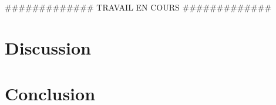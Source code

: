 \#\#\#\#\#\#\#\#\#\#\#\#\# TRAVAIL EN COURS \#\#\#\#\#\#\#\#\#\#\#\#\#







\section{Discussion}



\section{Conclusion}









